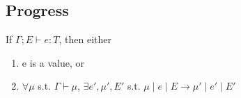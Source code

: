 \documentclass{llncs}
\begin{document}
%
%
%
\subsection{Progress}
\begin{theorem}[Progress]
If $\Gamma; E \vdash e : T$, then either
\begin{enumerate}
\item e is a value, or
\item $\forall \mu$ s.t.
		   $\Gamma \vdash \mu$,
         $\exists e', \mu', E'$ s.t. 
         $\mu \; | \; e \; | \; E \rightarrow \mu' \; | \; e' \; | \; E'$
\end{enumerate}
\end{theorem}





\end{document}
